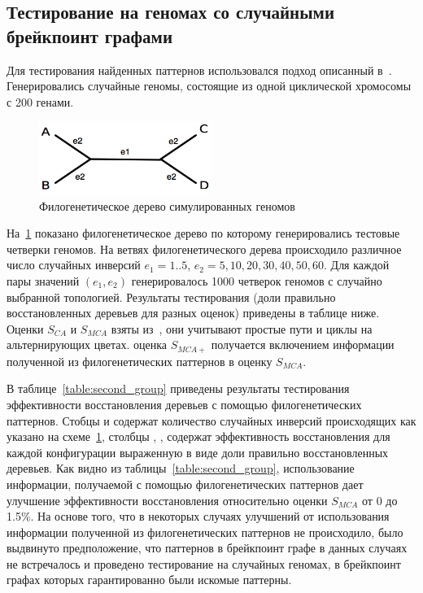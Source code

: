 \subsection{Тестирование на геномах со случайными брейкпоинт графами}
Для тестирования найденных паттернов использовался подход описанный в~\cite{xu2010exploring}.
Генерировались случайные геномы, состоящие из одной циклической хромосомы с 200 генами.
\begin{figure}[H]
  \centering
  \includegraphics[max width=0.5\textwidth]{fig/3/wei_xu_tree.png}
  \caption{Филогенетическое дерево симулированных геномов}
  \label{fig:testing_phyl_tree}
\end{figure}
\vspace{-1em}На~\ref{fig:testing_phyl_tree} показано филогенетическое дерево по которому генерировались тестовые четверки геномов.
На ветвях филогенетического дерева происходило различное число случайных инверсий $e_1 = 1..5$, $e_2 = 5, 10, 20, 30, 40, 50, 60$.
Для каждой пары значений $(e_1, e_2)$ генерировалось 1000 четверок геномов с случайно выбранной топологией.
Результаты тестирования (доли правильно восстановленных деревьев для разных оценок)
приведены в таблице ниже. Оценки $S_{CA}$ и $S_{MCA}$ взяты из~\cite{xu2010exploring}, они учитывают простые пути и циклы на альтернирующих цветах.
оценка $S_{MCA+}$ получается включением информации полученной из филогенетических паттернов в оценку $S_{MCA}$.

В таблице~\ref{table:second_group} приведены результаты тестирования эффективности восстановления деревьев с помощью филогенетических паттернов.
Стобцы  и  содержат количество случайных инверсий происходящих как указано на схеме~\ref{fig:testing_phyl_tree},
столбцы , ,  содержат эффективность восстановления для каждой конфигурации выраженную в виде доли правильно восстановленных деревьев.
Как видно из таблицы~\ref{table:second_group}, использование информации,
получаемой с помощью филогенетических паттернов дает улучшение эффективности восстановления относительно оценки $S_{MCA}$ от 0 до 1.5\%.
На основе того, что в некоторых случаях улучшений от использования информации полученной из филогенетических паттернов не происходило,
было выдвинуто предположение, что паттернов в брейкпоинт графе в данных случаях не встречалось и
проведено тестирование на случайных геномах, в брейкпоинт графах которых гарантированно были искомые паттерны.

